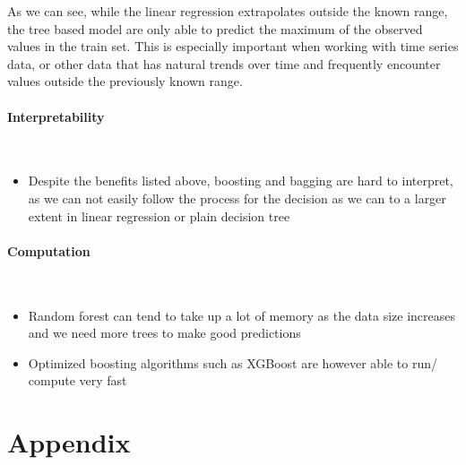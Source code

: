 \documentclass[10pt, a4paper, twocolumn]{article}
\newcommand{\myparagraph}[1]{\paragraph{#1}\mbox{}\\}
\begin{document}
	As we can see, while the linear regression extrapolates outside the known range, the tree based model are only able to predict the maximum of the observed values in the train set. This is especially important when working with time series data, or other data that has natural trends over time and frequently encounter values outside the previously known range.
	\myparagraph{Interpretability}
	\begin{itemize}
		\item Despite the benefits listed above, boosting and bagging are hard to interpret, as we can not easily follow the process for the decision as we can to a larger extent in linear regression or plain decision tree
	\end{itemize}
	\myparagraph{Computation}
	\begin{itemize}
		\item Random forest can tend to take up a lot of memory as the data size increases and we need more trees to make good predictions
		\item Optimized boosting algorithms such as XGBoost are however able to run/ compute very fast
	\end{itemize}

	
\onecolumn
\section{Appendix}
	
\twocolumn
	
\nocite{*}


\end{document}
